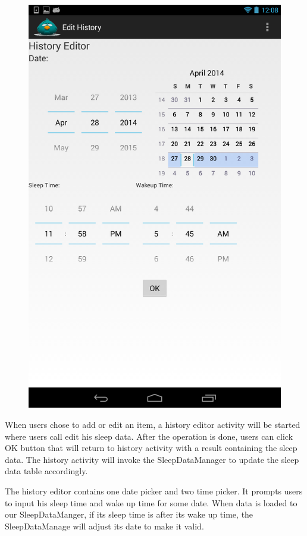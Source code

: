 \documentclass[14pt]{extreport}
\begin{document}
\begin{figure}[h]
\begin{center}
\includegraphics[width=5in]{edithistory_dialogue}
\end{center}
\end{figure}


When users chose to add or edit an item, a history editor activity will be started where users call edit his sleep data. After the operation is done, users can click OK button that will return to history activity with a result containing the sleep data. The history activity will invoke the SleepDataManager to update the sleep data table accordingly. 

The history editor contains one date picker and two time picker. It prompts users to input his sleep time and wake up time for some date. When data is loaded to our SleepDataManger, if its sleep time is after its wake up time, the SleepDataManage will adjust its date to make it valid.
\end{document}
